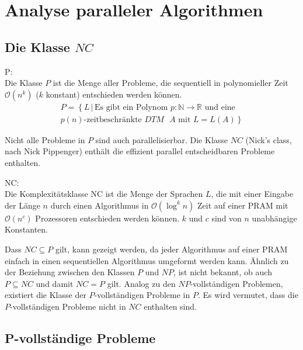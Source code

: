 \section{Analyse paralleler Algorithmen}

\subsection{Die Klasse $NC$}
\begin{define}
    P: \\
    Die Klasse $P$ ist die Menge aller Probleme, die sequentiell in polynomieller Zeit $\mathcal{O}(n^k)$ ($k$ konstant) entschieden werden können.
    \begin{equation}
        \begin{split}
            P = \left\{ L \, | \, \text{Es gibt ein Polynom } p\colon \mathbb{N} \to \mathbb{R} \right.
            \text{ und eine} \\ \left. \text{$p(n)$-zeitbeschränkte $DTM$ $A$ mit } L = L(A) \right\}
        \end{split}
    \end{equation}\cite[S.205]{fgi1}\cite[S.44]{greenlaw}
\end{define}
Nicht alle Probleme in $P$ sind auch parallelisierbar.
Die Klasse $NC$ (Nick's class, nach Nick Pippenger) enthält die effizient parallel
entscheidbaren Probleme enthalten.
\begin{define}
    NC: \\
    Die Komplexitätsklasse NC ist die Menge der Sprachen $L$,
    die mit einer Eingabe der Länge $n$ durch einen Algorithmus
    in $\mathcal{O}\left( \log^k n \right)$ Zeit auf einer PRAM
    mit $\mathcal{O}\left( n^c \right)$ Prozessoren entschieden werden können.
    $k$ und $c$ sind von $n$ unabhängige Konstanten.
\end{define}
Dass $NC \subseteq P$ gilt, kann gezeigt werden, da jeder Algorithmus auf einer PRAM
einfach in einen sequentiellen Algorithmus umgeformt werden kann.
Ähnlich zu der Beziehung zwischen den Klassen $P$ und $NP$, ist nicht bekannt,
ob auch $P \subseteq NC$ und damit $NC = P$ gilt.
Analog zu den $NP$-vollständigen Problemen, existiert die Klasse der $P$-vollständigen Probleme in $P$.
Es wird vermutet, dass die $P$-vollständigen Probleme nicht in $NC$ enthalten sind.
\cite[S.535]{jaja}

\subsection{P-vollständige Probleme}
